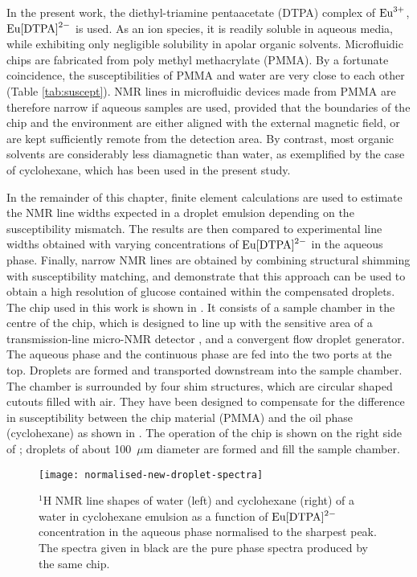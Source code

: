 In the present work, the diethyl-triamine pentaacetate (DTPA) complex
of $\ce{Eu^{3+}}$, $\ce{Eu[DTPA]^{2-}}$ is used. As an ion species, it is readily soluble
in aqueous media, while exhibiting only negligible solubility in apolar organic
solvents. Microfluidic chips are fabricated from poly methyl methacrylate (PMMA).
By a fortunate coincidence, the susceptibilities of PMMA and
water are very close to
each other (Table \ref{tab:suscept}).  NMR lines
in microfluidic devices made from PMMA are therefore narrow
if  aqueous samples are used, provided that the boundaries of the chip and the environment
are either aligned with the external magnetic field, or are kept sufficiently
remote from the detection area. By contrast, most organic solvents are
considerably less diamagnetic than water, as exemplified by the
case of cyclohexane, which has been used in the present study.

In the remainder of this chapter,
finite element calculations are used to estimate
the NMR line widths expected in a droplet emulsion
depending on the susceptibility mismatch.
The results are then compared to experimental
line widths obtained with varying concentrations
of $\ce{Eu[DTPA]^{2-}}$ in the aqueous phase. Finally,
narrow NMR lines are obtained by
combining structural shimming \citep{Ryan:2014hl} with
susceptibility matching, and demonstrate that this
approach can be used to obtain a high resolution of glucose contained within the compensated droplets.
The chip used in this work is shown in . It consists of a sample
chamber in the centre of the chip, which is designed to line up with
the sensitive area of a transmission-line
micro-NMR detector \citep{Finch:2016gv}, and a convergent flow droplet
generator. The aqueous phase and the continuous
phase are fed into the two ports at the top. Droplets are
formed and transported downstream into the sample chamber.
 The chamber is surrounded by four shim structures, which are circular
 shaped cutouts filled with air. They have been designed to compensate
 for the difference in susceptibility between the chip material (PMMA)
 and the oil phase (cyclohexane) as shown in . The operation of the chip is shown
 on the right side of ; droplets of about 100~$\mu$m diameter are formed and
 fill the sample chamber.



\begin{figure}
  \begin{center}
    \texttt{[image: normalised-new-droplet-spectra]}
  \end{center}
  \caption{$^1$H NMR line shapes of water (left) and cyclohexane (right) of a
  water in cyclohexane emulsion as a function of $\ce{Eu[DTPA]^{2-}}$ concentration
  in the aqueous phase normalised to the sharpest peak. The spectra given in black are the pure phase spectra produced by the same chip.
  }
  \label{fig:droplet-spectra}
\end{figure}


